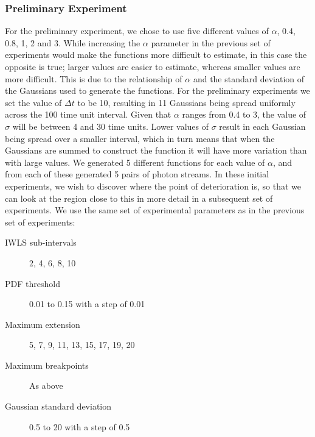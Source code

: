 \documentclass[a4paper,11pt]{article}
\begin{document}
\subsubsection{Preliminary Experiment}
\label{sec-7-2-1}

For the preliminary experiment, we chose to use five different values of
$\alpha$, 0.4, 0.8, 1, 2 and 3. While increasing the $\alpha$ parameter in the
previous set of experiments would make the functions more difficult to estimate,
in this case the opposite is true; larger values are easier to estimate, whereas
smaller values are more difficult. This is due to the relationship of $\alpha$
and the standard deviation of the Gaussians used to generate the functions. For
the preliminary experiments we set the value of $\Delta t$ to be 10, resulting
in 11 Gaussians being spread uniformly across the 100 time unit interval. Given
that $\alpha$ ranges from 0.4 to 3, the value of $\sigma$ will be between 4 and
30 time units. Lower values of $\sigma$ result in each Gaussian being spread
over a smaller interval, which in turn means that when the Gaussians are summed
to construct the function it will have more variation than with large values. We
generated 5 different functions for each value of $\alpha$, and from each of
these generated 5 pairs of photon streams. In these initial experiments, we wish
to discover where the point of deterioration is, so that we can look at the
region close to this in more detail in a subsequent set of experiments. We use
the same set of experimental parameters as in the previous set of experiments:
\begin{description}
\item[IWLS sub-intervals] 2, 4, 6, 8, 10
\item[PDF threshold] 0.01 to 0.15 with a step of 0.01
\item[Maximum extension] 5, 7, 9, 11, 13, 15, 17, 19, 20
\item[Maximum breakpoints] As above
\item[Gaussian standard deviation] 0.5 to 20 with a step of 0.5
\end{description}
\end{document}
